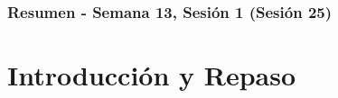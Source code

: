 \documentclass[10pt]{beamer}
\begin{document}
\myfront{}

\begin{frame}
  \titlepage
\end{frame}

\begin{frame}
  \frametitle{Resumen - Semana 13, Sesión 1 (Sesión 25)}
  \tableofcontents
\end{frame}


\section{Introducción y Repaso}
\end{document}
